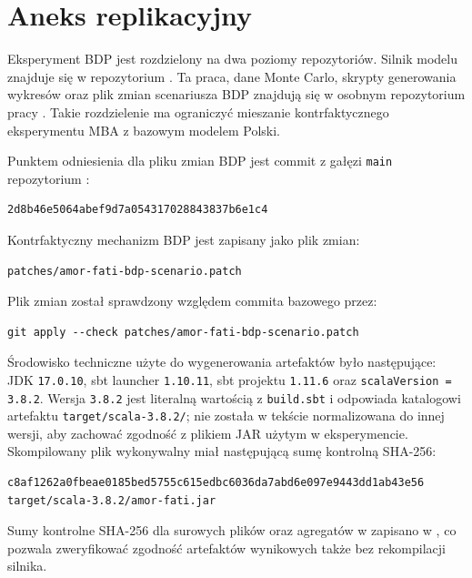 \section{Aneks replikacyjny}

Eksperyment BDP jest rozdzielony na dwa poziomy repozytoriów. Silnik modelu znajduje się w repozytorium \amor{}. Ta praca, dane Monte Carlo, skrypty generowania wykresów oraz plik zmian scenariusza BDP znajdują się w osobnym repozytorium pracy \paperrepo{}. Takie rozdzielenie ma ograniczyć mieszanie kontrfaktycznego eksperymentu MBA z bazowym modelem Polski.

Punktem odniesienia dla pliku zmian BDP jest commit z gałęzi \texttt{main} repozytorium \amor{}:

\begin{verbatim}
2d8b46e5064abef9d7a054317028843837b6e1c4
\end{verbatim}

Kontrfaktyczny mechanizm BDP jest zapisany jako plik zmian:

\begin{verbatim}
patches/amor-fati-bdp-scenario.patch
\end{verbatim}

Plik zmian został sprawdzony względem commita bazowego przez:

\begin{verbatim}
git apply --check patches/amor-fati-bdp-scenario.patch
\end{verbatim}

Środowisko techniczne użyte do wygenerowania artefaktów było następujące: JDK \texttt{17.0.10}, sbt launcher \texttt{1.10.11}, sbt projektu \texttt{1.11.6} oraz \texttt{scalaVersion = 3.8.2}. Wersja \texttt{3.8.2} jest literalną wartością z \texttt{build.sbt} i odpowiada katalogowi artefaktu \texttt{target/scala-3.8.2/}; nie została w tekście normalizowana do innej wersji, aby zachować zgodność z plikiem JAR użytym w eksperymencie. Skompilowany plik wykonywalny miał następującą sumę kontrolną SHA-256:

\begin{verbatim}
c8af1262a0fbeae0185bed5755c615edbc6036da7abd6e097e9443dd1ab43e56
target/scala-3.8.2/amor-fati.jar
\end{verbatim}

Sumy kontrolne SHA-256 dla surowych plików  oraz agregatów w  zapisano w , co pozwala zweryfikować zgodność artefaktów wynikowych także bez rekompilacji silnika.


